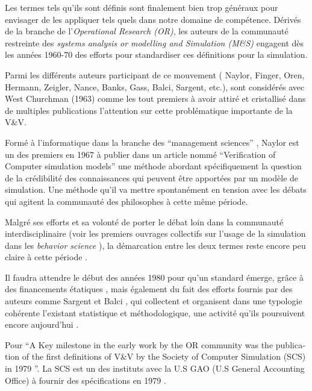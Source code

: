 Les termes tels qu'ils sont définis sont finalement bien trop généraux pour envisager de les appliquer tels quels dans notre domaine de compétence. Dérivés de la branche de l'\textit{Operational Research (OR)}, les auteurs de la communauté restreinte des \textit{systems analysis or modelling and Simulation (M\&S) } engagent dès les années 1960-70 des efforts pour standardiser ces définitions pour la simulation.

Parmi les différents auteurs participant de ce mouvement ( Naylor, Finger, Oren, Hermann, Zeigler, Nance, Banks, Gass, Balci, Sargent, etc.), \textcite{Naylor1966} sont considérés avec West Churchman (1963) comme les tout premiers à avoir attiré et cristallisé  dans de multiples publications l'attention sur cette problématique importante de la V\&V.

Formé à l'informatique dans la branche des \foreignquote{english}{management sciences} \autocite{Stricklin1985}, Naylor est un des premiers en 1967 \autocite{Naylor1967} à publier dans un article nommé \foreignquote{english}{Verification of Computer simulation models} une méthode abordant spécifiquement la question de la crédibilité des connaissances qui peuvent être apportées par un modèle de simulation. Une méthode qu'il va mettre spontanément en tension avec les débats qui agitent la communauté des philosophes à cette même période.

Malgré ses efforts et sa volonté de porter le débat loin dans la communauté interdisciplinaire (voir les premiers ouvrages collectifs sur l'usage de la simulation dans les \textit{behavior science} \autocites{Dutton1971, Guetzkow1972} ), la démarcation entre les deux termes reste encore peu claire à cette période  \autocites[165]{Nance2002}[3]{Balci1986}.

Il faudra attendre le début des années 1980 pour qu'un standard émerge, grâce à des financements étatiques \autocite{Balci1986}, mais également du fait des efforts fournis par des auteurs comme Sargent et Balci \autocite{Nance2002}, qui collectent et organisent dans une typologie cohérente l'existant statistique et méthodologique, une activité qu'ils poursuivent encore aujourd'hui \autocite{Balci1998} .

Pour \textcite[22]{Oberkampf2010} \foreignquote{english}{A Key milestone in the early work by the OR community was the publication of the first definitions of V\&V by the Society of Computer Simulation (SCS) in 1979 \autocite{Schlesinger1979}}. La SCS est un des instituts avec la U.S GAO (U.S General Accounting Office) à fournir des spécifications en 1979 \autocite{Balci1986}.

